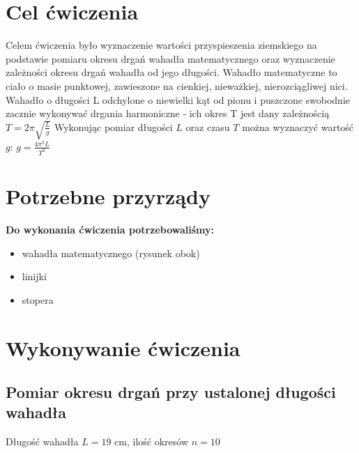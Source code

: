 \documentclass[a4paper,11pt]{article}
\begin{document}



\section{Cel ćwiczenia}
Celem ćwiczenia było wyznaczenie wartości przyspieszenia ziemskiego na podstawie pomiaru okresu drgań wahadła matematycznego oraz wyznaczenie zależności okresu drgań wahadła od jego długości. 
Wahadło matematyczne to ciało o masie punktowej, zawieszone na cienkiej, nieważkiej, nierozciągliwej nici. Wahadło o długości L odchylone o niewielki kąt od pionu i puszczone swobodnie zacznie wykonywać drgania harmoniczne - ich okres T jest dany zależnością $T = 2\pi\sqrt{\frac{L}{g}} $
Wykonując pomiar długości $L$ oraz czasu $T$ można wyznaczyć wartość $g$: $g = \frac{4\pi^2 L}{T^2}$
\section{Potrzebne przyrządy}



\begin{minipage}{10cm}
\vspace{-5cm}
\textbf{Do wykonania ćwiczenia potrzebowaliśmy:}
\begin{itemize}
\item wahadła matematycznego (rysunek obok)
\item linijki
\item stopera
\end{itemize} 
\end{minipage}
\begin{minipage}{5cm}
\end{minipage}

\newpage

\section{Wykonywanie ćwiczenia}
\subsection{Pomiar okresu drgań przy ustalonej długości wahadła}

Długość wahadła $L = 19$ cm, ilość okresów $n=10$
\end{document}
